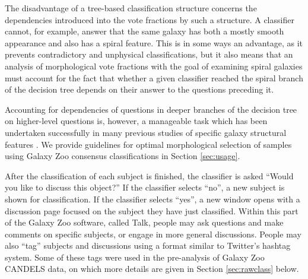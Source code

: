 \documentclass[useAMS,usenatbib]{mn2e}
\begin{document}
{The disadvantage of a tree-based classification structure concerns the dependencies introduced into the vote fractions by such a structure. A classifier cannot, for example, answer that the same galaxy has both a mostly smooth appearance and also has a spiral feature. This is in some ways an advantage, as it prevents contradictory and unphysical classifications, but it also means that an analysis of morphological vote fractions with the goal of examining spiral galaxies must account for the fact that whether a given classifier reached the spiral branch of the decision tree depends on their answer to the questions preceding it. 

Accounting for dependencies of questions in deeper branches of the decision tree on higher-level questions is, however, a manageable task which has been undertaken successfully in many previous studies of specific galaxy structural features \citep[for specific examples, see e.g.][]{masters11a,melvin14,galloway15}. We provide guidelines for optimal morphological selection of samples using Galaxy Zoo consensus classifications in Section \ref{sec:usage}.

After the classification of each subject is finished, the classifier is asked ``Would you like to discuss this object?'' If the classifier selects ``no'', a new subject is shown for classification. If the classifier selects ``yes'', a new window opens with a discussion page focused on the subject they have just classified. Within this part of the Galaxy Zoo software, called Talk, people may ask questions and make comments on specific subjects, or engage in more general discussions. People may also ``tag'' subjects and discussions using a format similar to Twitter's hashtag system. Some of these tags were used in the pre-analysis of Galaxy Zoo CANDELS data, on which more details are given in Section \ref{sec:rawclass} below.



}
\end{document}

